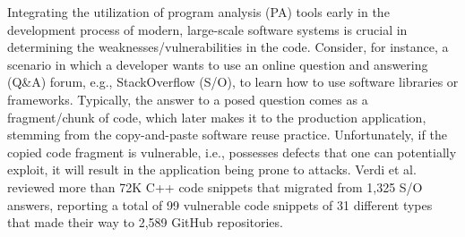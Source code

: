 Integrating the utilization of program analysis (PA) tools early in the development process of modern, large-scale software systems is crucial in determining the weaknesses/vulnerabilities in the code. Consider, for instance, a scenario in which a developer wants to use an online question and answering (Q\&A) forum, e.g., StackOverflow (S/O), to learn how to use software libraries or frameworks. Typically, the answer to a posed question comes as a fragment/chunk of code, which later makes it to the production application, stemming from the copy-and-paste software reuse practice. Unfortunately, if the copied code fragment is vulnerable, i.e., possesses defects that one can potentially exploit, it will result in the application being prone to attacks. Verdi et al. \cite{verdi-tse22} reviewed more than 72K C++ code snippets that migrated from 1,325 S/O answers, reporting a total of 99 vulnerable code snippets of 31 different types that made their way to 2,589 GitHub repositories.

